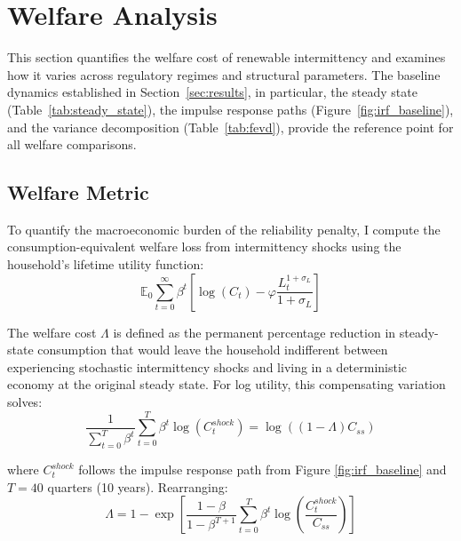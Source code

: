 \documentclass[12pt, a4paper]{article}
\begin{document}
	\section{Welfare Analysis} \label{sec:welfare}
	
	This section quantifies the welfare cost of renewable intermittency and examines how it varies across regulatory regimes and structural parameters. The baseline dynamics established in Section~\ref{sec:results}, in particular, the steady state (Table~\ref{tab:steady_state}), the impulse response paths (Figure~\ref{fig:irf_baseline}), and the variance decomposition (Table~\ref{tab:fevd}), provide the reference point for all welfare comparisons.
	
	\subsection{Welfare Metric}
	
	To quantify the macroeconomic burden of the reliability penalty, I compute the consumption-equivalent welfare loss from intermittency shocks using the household's lifetime utility function:
	\begin{equation}
		\mathbb{E}_0 \sum_{t=0}^{\infty} \beta^t \left[ \log(C_t) - \varphi \frac{L_t^{1+\sigma_L}}{1+\sigma_L} \right]
	\end{equation}
	
	The welfare cost $\Lambda$ is defined as the permanent percentage reduction in steady-state consumption that would leave the household indifferent between experiencing stochastic intermittency shocks and living in a deterministic economy at the original steady state. For log utility, this compensating variation solves:
	\begin{equation}
		\frac{1}{\sum_{t=0}^{T} \beta^t} \sum_{t=0}^{T} \beta^t \log(C_t^{shock}) = \log((1-\Lambda)C_{ss})
	\end{equation}
	
	where $C_t^{shock}$ follows the impulse response path from Figure \ref{fig:irf_baseline} and $T = 40$ quarters (10 years). Rearranging:
	\begin{equation}
		\Lambda = 1 - \exp\left[\frac{1-\beta}{1-\beta^{T+1}} \sum_{t=0}^{T} \beta^t \log\left(\frac{C_t^{shock}}{C_{ss}}\right)\right]
		\label{eq:welfare_formula}
	\end{equation}
	
\end{document}
